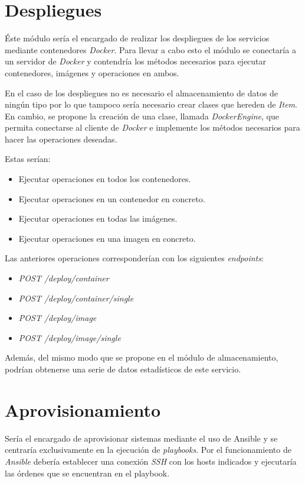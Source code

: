 \section{Despliegues}

Éste módulo sería el encargado de realizar los despliegues de los servicios mediante contenedores \textit{Docker}. Para llevar a cabo esto el módulo se conectaría a un servidor de \textit{Docker} y contendría los métodos necesarios para ejecutar contenedores, imágenes y operaciones en ambos.

En el caso de los despliegues no es necesario el almacenamiento de datos de ningún tipo por lo que tampoco sería necesario crear clases que hereden de \textit{Item}. En cambio, se propone la creación de una clase, llamada \textit{DockerEngine}, que permita conectarse al cliente de \textit{Docker} e implemente los métodos necesarios para hacer las operaciones deseadas.

Estas serían:
\begin{itemize}
	\item Ejecutar operaciones en todos los contenedores.
	\item Ejecutar operaciones en un contenedor en concreto.
	\item Ejecutar operaciones en todas las imágenes.
	\item Ejecutar operaciones en una imagen en concreto.
\end{itemize}


\bigskip
Las anteriores operaciones corresponderían con los siguientes \textit{endpoints}:
\begin{itemize}
	\item \textit{POST /deploy/container}
	\item \textit{POST /deploy/container/single}
	\item \textit{POST /deploy/image}
	\item \textit{POST /deploy/image/single}
\end{itemize}


\bigskip
Además, del mismo modo que se propone en el módulo de almacenamiento, podrían obtenerse una serie de datos estadísticos de este servicio.





\section{Aprovisionamiento}
Sería el encargado de aprovisionar sistemas mediante el uso de Ansible y se centraría exclusivamente en la ejecución de \textit{playbooks}. Por el funcionamiento de \textit{Ansible} debería establecer una conexión \textit{SSH} con los hosts indicados y ejecutaría las órdenes que se encuentran en el playbook.

